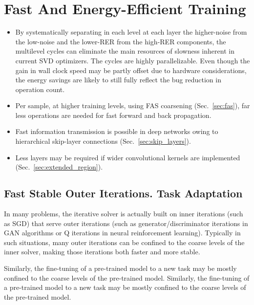 \documentclass{article} %
\begin{document}
\section{Fast And Energy-Efficient Training}
\label{sec:benefits}
\begin{itemize}
    \item By systematically separating in each level at each layer the higher-noise from the low-noise and the lower-RER from the high-RER components, the multilevel cycles can eliminate the main resources of slowness inherent in current SVD optimizers. The cycles are highly parallelizable. Even though the gain in wall clock speed may be partly offset due to hardware considerations, the energy savings are likely to still fully reflect the bug reduction in operation count.
    \item Per sample, at higher training levels, using FAS coarsening (Sec.~\ref{sec:fas}), far less operations are needed for fast forward and back propagation.
    \item Fast information transmission is possible in deep networks owing to hierarchical skip-layer connections (Sec.~\ref{sec:skip_layers}).
    \item Less layers may be required if wider convolutional kernels are implemented (Sec.~\ref{sec:extended_region}).
\end{itemize}

\subsection{Fast Stable Outer Iterations. Task Adaptation}
\label{sec:out_iteration}
In many problems, the iterative solver is actually built on inner iterations (such as SGD) that serve outer iterations (such as generator/discriminator iterations in GAN algorithms or Q iterations in neural reinforcement learning). Typically in such situations, many outer iterations can be confined to the coarse levels of the inner solver, making those iterations both faster and more stable.

Similarly, the fine-tuning of a pre-trained model to a new task may be mostly confined to the coarse levels of the pre-trained model. Similarly, the fine-tuning of a pre-trained model to a new task may be mostly confined to the coarse levels of the pre-trained model.
\end{document}
